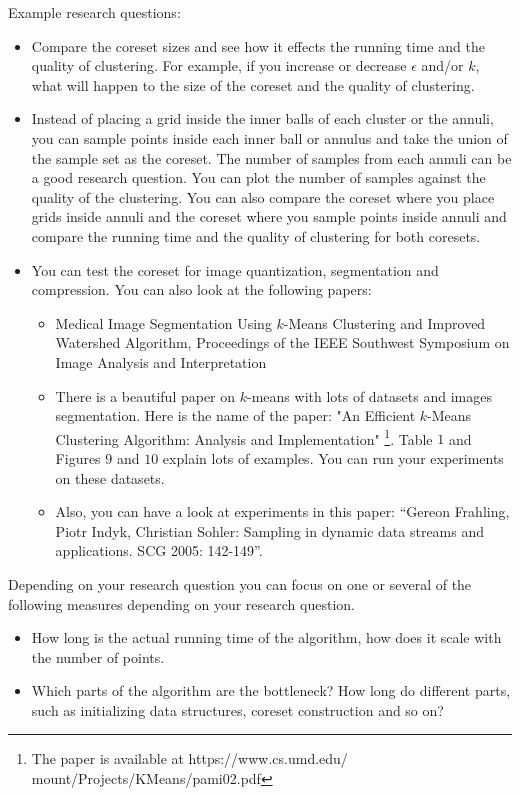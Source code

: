 \documentclass[11pt]{article}
\begin{document}
Example research questions:
\begin{itemize}
\item Compare the coreset sizes and see how it effects the running time and the quality of clustering. 
For example, if you increase or decrease  $\epsilon$ and/or $k$, what will happen to the size of the coreset and the quality of clustering. 
\item Instead of placing a grid inside the inner balls of each cluster or the annuli, you can sample  points inside each inner ball or annulus and take the union of the sample set as the coreset. The number of samples from each annuli can be a good research question. You can plot the number of samples against the quality of the clustering. You can also compare the coreset where you place grids inside annuli and the coreset where you sample points inside annuli and compare the running time and the quality of clustering for both coresets. 
\item You can test the coreset for image quantization, segmentation and compression. 
You can also look at the following papers:
\begin{itemize}
\item Medical Image Segmentation Using $k$-Means Clustering and Improved Watershed Algorithm, Proceedings of the IEEE Southwest Symposium on Image Analysis and Interpretation
\item There is a beautiful paper on $k$-means with lots of datasets and images segmentation. Here is the name of the paper: 
"An Efficient $k$-Means Clustering Algorithm: Analysis and Implementation"
\footnote{The paper is available at https://www.cs.umd.edu/$~$mount/Projects/KMeans/pami02.pdf}. 
Table $1$ and Figures $9$ and $10$ explain lots of examples. You can run your experiments on these datasets. 
\item Also, you can have a look at experiments in this paper: “Gereon Frahling, Piotr Indyk, Christian Sohler: Sampling in dynamic data streams and applications. SCG 2005: 142-149”.
\end{itemize}

\end{itemize}



Depending on your research question you can focus on one or several of the following measures depending on your research question. 
\begin{itemize}
\item How long is the actual running time of the algorithm, how does it scale with the number of points. 

\item Which parts of the algorithm are the bottleneck? How long do different parts, such as initializing data structures, coreset construction and so on?
\end{itemize}
\end{document}
